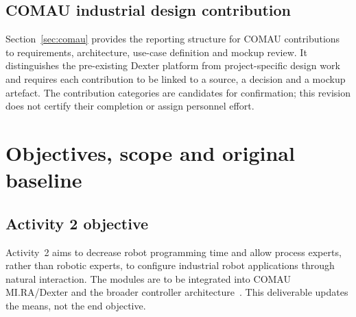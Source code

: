 \documentclass{plan4ari_report}
\begin{document}
\subsection{COMAU industrial design contribution}
Section~\ref{sec:comau} provides the reporting structure for COMAU contributions to requirements, architecture, use-case definition and mockup review. It distinguishes the pre-existing Dexter platform from project-specific design work and requires each contribution to be linked to a source, a decision and a mockup artefact. The contribution categories are candidates for confirmation; this revision does not certify their completion or assign personnel effort.

\section{Objectives, scope and original baseline}\label{sec:objectives}

\subsection{Activity 2 objective}
Activity~2 aims to decrease robot programming time and allow process experts, rather than robotic experts, to configure industrial robot applications through natural interaction. The modules are to be integrated into COMAU MI.RA/Dexter and the broader \PlanARI{} controller architecture~\cite{plan4ari_pd}. This deliverable updates the means, not the end objective.
\end{document}
